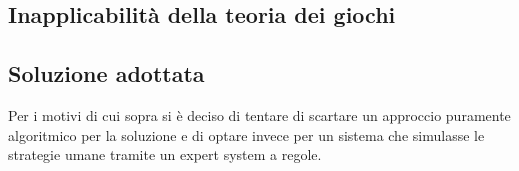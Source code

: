 \subsection{Inapplicabilità della teoria dei giochi}



\subsection{Soluzione adottata}
Per i motivi di cui sopra si è deciso di tentare di scartare un approccio puramente algoritmico per la soluzione e di optare invece per un sistema che simulasse le strategie umane tramite un expert system a regole.
